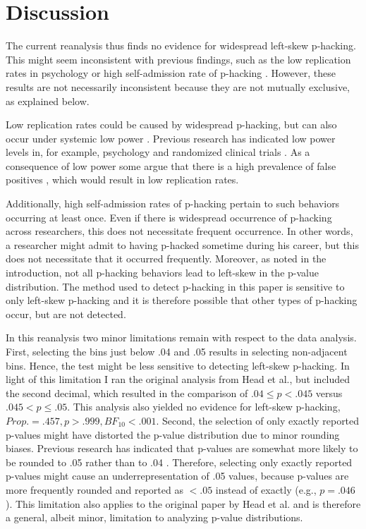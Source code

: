 \section*{Discussion} 
The current reanalysis thus finds no evidence for widespread left-skew p-hacking. This might seem inconsistent with previous findings, such as the low replication rates in psychology \cite{Open_Science_Collaboration2015-zs} or high self-admission rate of p-hacking \cite{John2012-uj}. However, these results are not necessarily inconsistent because they are not mutually exclusive, as explained below. 

Low replication rates could be caused by widespread p-hacking, but can also occur under systemic low power \cite{Bakker2014-lr,Bakker_2012}. Previous research has indicated low power levels in, for example, psychology \cite{Cohen1962-jc,Sedlmeier1989-yc} and randomized clinical trials \cite{Moher1994-ra}. As a consequence of low power some argue that there is a high prevalence of false positives \cite{Ioannidis2005-am}, which would result in low replication rates.

Additionally, high self-admission rates of p-hacking \cite{John2012-uj} pertain to such behaviors occurring at least once. Even if there is widespread occurrence of p-hacking across researchers, this does not necessitate frequent occurrence. In other words, a researcher might admit to having p-hacked sometime during his career, but this does not necessitate that it occurred frequently. Moreover, as noted in the introduction, not all p-hacking behaviors lead to left-skew in the p-value distribution. The method used to detect p-hacking in this paper is sensitive to only left-skew p-hacking and it is therefore possible that other types of p-hacking occur, but are not detected.

In this reanalysis two minor limitations remain with respect to the data analysis. First, selecting the bins just below .04 and .05 results in selecting non-adjacent bins. Hence, the test might be less sensitive to detecting left-skew p-hacking. In light of this limitation I ran the original analysis from Head et al., but included the second decimal, which resulted in the comparison of $.04\leq p<.045$ versus $.045<p\leq.05$. This analysis also yielded no evidence for left-skew p-hacking, $Prop.=.457,p>.999,BF_{10}<.001$. Second, the selection of only exactly reported p-values might have distorted the p-value distribution due to minor rounding biases. Previous research has indicated that p-values are somewhat more likely to be rounded to .05 rather than to .04 \cite{Krawczyk2015-uh}. Therefore, selecting only exactly reported p-values might cause an underrepresentation of .05 values, because p-values are more frequently rounded and reported as $<.05$ instead of exactly (e.g., $p=.046$). This limitation also applies to the original paper by Head et al. and is therefore a general, albeit minor, limitation to analyzing p-value distributions.

